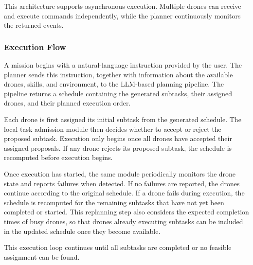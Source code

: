 This architecture supports asynchronous execution. 
Multiple drones can receive and execute commands independently, while the planner continuously monitors the returned events.

\subsubsection{Execution Flow}

A mission begins with a natural-language instruction provided by the user. 
The planner sends this instruction, together with information about the available drones, skills, and environment, 
to the LLM-based planning pipeline. 
The pipeline returns a schedule containing the generated subtasks, their assigned drones, and their planned execution order.

Each drone is first assigned its initial subtask from the generated schedule. 
The local task admission module then decides whether to accept or reject the proposed subtask. 
Execution only begins once all drones have accepted their assigned proposals.
If any drone rejects its proposed subtask, the schedule is recomputed before execution begins. 

Once execution has started, the same module periodically monitors the drone state and reports failures when detected. 
If no failures are reported, the drones continue according to the original schedule. 
If a drone fails during execution, the schedule is recomputed for the remaining subtasks that have not yet been completed or started. 
This replanning step also considers the expected completion times of busy drones, 
so that drones already executing subtasks can be included in the updated schedule once they become available.

This execution loop continues until all subtasks are completed or no feasible assignment can be found.